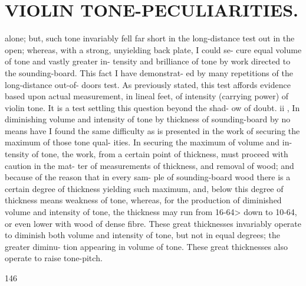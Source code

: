 \documentclass{article}
\begin{document}
\section*{VIOLIN TONE-PECULIARITIES.}
alone; but, such tone invariably fell far short in the long-distance test out in the open; whereas, with a strong, unyielding back plate, I could se- cure equal volume of tone and vastly greater in- tensity and brilliance of tone by work directed to the sounding-board. This fact I have demonstrat- ed by many repetitions of the long-distance out-of- doors test. As previously stated, this test affords evidence based upon actual measurement, in lineal feet, of intensity (carrying power) of violin tone. It is a test settling this question beyond the shad- ow of doubt. ii , In diminishing volume and intensity of tone by thickness of sounding-board by no means have I found the same difficulty as is presented in the work of securing the maximum of those tone qual- ities. In securing the maximum of volume and in- tensity of tone, the work, from a certain point of thickness, must proceed with caution in the mat- ter of measurements of thickness, and removal of wood; and because of the reason that in every sam- ple of sounding-board wood there is a certain degree of thickness yielding such maximum, and, below this degree of thickness means weakness of tone, whereas, for the production of diminished volume and intensity of tone, the thickness may run from 16-64> down to 10-64, or even lower with wood of dense fibre. These great thicknesses invariably operate to diminish both volume and intensity of tone, but not in equal degrees; the greater diminu- tion appearing in volume of tone. These great thicknesses also operate to raise tone-pitch.

146
\end{document}
